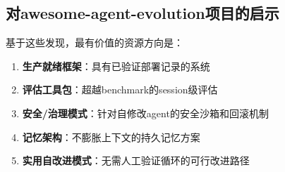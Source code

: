 \subsection{对awesome-agent-evolution项目的启示}

基于这些发现，最有价值的资源方向是：

\begin{enumerate}[nosep]
\item \textbf{生产就绪框架}：具有已验证部署记录的系统
\item \textbf{评估工具包}：超越benchmark的session级评估
\item \textbf{安全/治理模式}：针对自修改agent的安全沙箱和回滚机制
\item \textbf{记忆架构}：不膨胀上下文的持久记忆方案
\item \textbf{实用自改进模式}：无需人工验证循环的可行改进路径
\end{enumerate}
